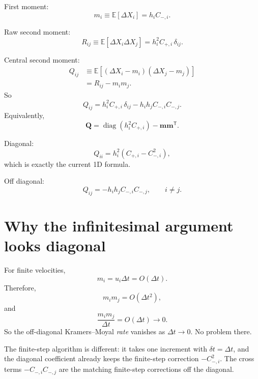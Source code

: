 \documentclass[11pt]{article}
\newcommand{\mean}[1]{\mathbb{E}\!\left[#1\right]}
\newcommand{\diag}{\operatorname{diag}}
\begin{document}
First moment:
\begin{equation}
  m_i\equiv\mean{\Delta X_i}=h_i C_{-,i}.
\end{equation}

Raw second moment:
\begin{equation}
  R_{ij}\equiv\mean{\Delta X_i\Delta X_j}
  =h_i^2 C_{+,i}\,\delta_{ij}.
\end{equation}

Central second moment:
\begin{align}
  Q_{ij}
  &\equiv
  \mean{(\Delta X_i-m_i)(\Delta X_j-m_j)}
  \\
  &=R_{ij}-m_i m_j.
\end{align}
So
\begin{equation}
  \boxed{
  Q_{ij}
  =
  h_i^2 C_{+,i}\,\delta_{ij}
  -
  h_i h_j C_{-,i}C_{-,j}.
  }
\end{equation}
Equivalently,
\begin{equation}
  \boxed{
  \mathbf{Q}
  =
  \diag\!\left(h_i^2 C_{+,i}\right)
  -
  \mathbf{m}\mathbf{m}^{\mathsf T}.
  }
\end{equation}

Diagonal:
\begin{equation}
  Q_{ii}=h_i^2\left(C_{+,i}-C_{-,i}^2\right),
\end{equation}
which is exactly the current 1D formula.

Off diagonal:
\begin{equation}
  \boxed{
  Q_{ij}=-h_i h_j C_{-,i}C_{-,j},
  \qquad i\neq j.
  }
\end{equation}

\section*{Why the infinitesimal argument looks diagonal}

For finite velocities,
\begin{equation}
  m_i=u_i\Delta t=O(\Delta t).
\end{equation}
Therefore,
\begin{equation}
  m_i m_j=O(\Delta t^2),
\end{equation}
and
\begin{equation}
  \frac{m_i m_j}{\Delta t}=O(\Delta t)\rightarrow0.
\end{equation}
So the off-diagonal Kramers--Moyal \emph{rate} vanishes as
\(\Delta t\rightarrow0\). No problem there.

The finite-step algorithm is different: it takes one increment with
\(\delta t=\Delta t\), and the diagonal coefficient already keeps the
finite-step correction \(-C_{-,i}^2\). The cross terms
\(-C_{-,i}C_{-,j}\) are the matching finite-step corrections off the diagonal.
\end{document}
